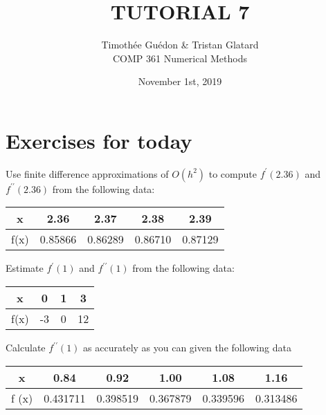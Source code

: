 \documentclass[12pt]{article}
\newenvironment{exercise}[2][Exercise]{\begin{trivlist}
\item[\hskip \labelsep {\bfseries #1}\hskip \labelsep {\bfseries #2.}]}{\end{trivlist}}
\begin{document}
\title{TUTORIAL 7}
\author{Timothée Guédon \& Tristan Glatard\\
COMP 361 Numerical Methods}
\date{November 1st, 2019}
\maketitle

\section{Exercises for today}

\begin{exercise}{1}
  Use finite difference approximations of \(O(h^2)\) to compute \(f^\prime (2.36)\) and \(f^{\prime \prime} (2.36)\) from the following data:

  \begin{table}[h]
    \centering
    \begin{tabular}{|c|c|c|c|c|}
      \hline
      x & 2.36 & 2.37 & 2.38 & 2.39 \\ \hline
      f(x) & 0.85866 & 0.86289 & 0.86710 & 0.87129 \\ \hline
    \end{tabular}
  \end{table}
\end{exercise}

\begin{exercise}{2}
  Estimate \(f^\prime (1)\) and \(f^{\prime \prime} (1)\) from the following data:

  \begin{table}[h]
    \centering
    \begin{tabular}{|c|c|c|c|}
      \hline
      x & 0& 1& 3\\ \hline
      f(x) & -3 &0 &12 \\ \hline
    \end{tabular}
  \end{table}
\end{exercise}

\begin{exercise}{3}
  Calculate $f^{\prime \prime}(1)$ as accurately as you can given the following data
  \begin{table}[h]
    \centering
    \begin{tabular}{|c|c|c|c|c|c|}
      \hline
      x &0.84& 0.92& 1.00& 1.08& 1.16\\ \hline
      f (x) &0.431711 &0.398519& 0.367879& 0.339596 & 0.313486 \\ \hline
    \end{tabular}
  \end{table}
\end{exercise}
\end{document}
